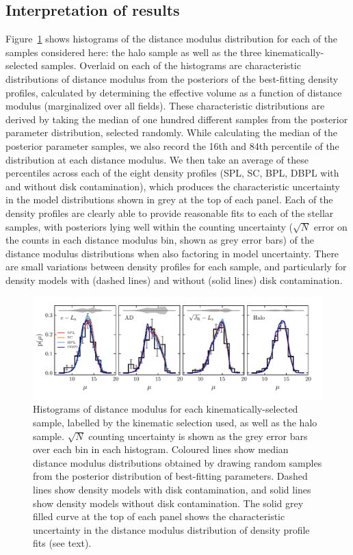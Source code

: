 \subsection{Interpretation of results}
\label{subsec:interpretation-of-results}

Figure~\ref{fig:pdistmod} shows histograms of the distance modulus distribution for each of the samples considered here: the halo sample as well as the three kinematically-selected \gse samples. Overlaid on each of the histograms are characteristic distributions of distance modulus from the posteriors of the best-fitting density profiles, calculated by determining the effective volume as a function of distance modulus (marginalized over all fields). These characteristic distributions are derived by taking the median of one hundred different samples from the posterior parameter distribution, selected randomly. While calculating the median of the posterior parameter samples, we also record the 16th and 84th percentile of the distribution at each distance modulus. We then take an average of these percentiles across each of the eight density profiles (SPL, SC, BPL, DBPL with and without disk contamination), which produces the characteristic uncertainty in the model distributions shown in grey at the top of each panel. Each of the density profiles are clearly able to provide reasonable fits to each of the stellar samples, with posteriors lying well within the counting uncertainty ($\sqrt{N}$ error on the counts in each distance modulus bin, shown as grey error bars) of the distance modulus distributions when also factoring in model uncertainty. There are small variations between density profiles for each sample, and particularly for density models with (dashed lines) and without (solid lines) disk contamination. 

\begin{figure}
    \centering
    \includegraphics[width=\linewidth]{figure/ch3/pdistmod.pdf}
    \caption{Histograms of distance modulus for each kinematically-selected \gse sample, labelled by the kinematic selection used, as well as the halo sample. $\sqrt{N}$ counting uncertainty is shown as the grey error bars over each bin in each histogram. Coloured lines show median distance modulus distributions obtained by drawing random samples from the posterior distribution of best-fitting parameters. Dashed lines show density models with disk contamination, and solid lines show density models without disk contamination. The solid grey filled curve at the top of each panel shows the characteristic uncertainty in the distance modulus distribution of density profile fits (see text).}
    \label{fig:pdistmod}
\end{figure}

